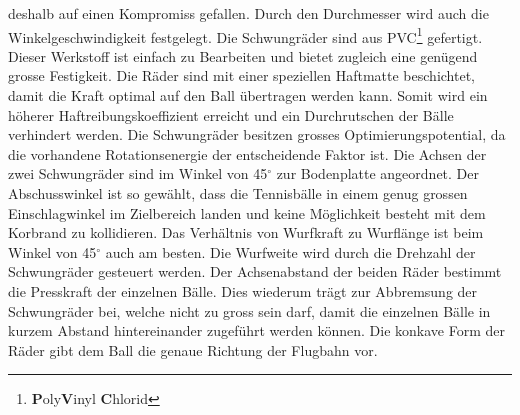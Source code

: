 deshalb auf einen Kompromiss gefallen. Durch den Durchmesser wird auch die Winkelgeschwindigkeit
festgelegt. Die Schwungräder sind aus PVC\footnote{\textbf{P}oly\textbf{V}inyl \textbf{C}hlorid}
gefertigt. Dieser Werkstoff ist einfach zu Bearbeiten und bietet zugleich eine genügend grosse
Festigkeit. Die Räder sind mit einer speziellen Haftmatte beschichtet, damit die Kraft optimal auf
den Ball übertragen werden kann. Somit wird ein höherer Haftreibungskoeffizient erreicht und ein
Durchrutschen der Bälle verhindert werden. Die Schwungräder besitzen grosses Optimierungspotential,
da die vorhandene Rotationsenergie der entscheidende Faktor ist. Die Achsen der zwei Schwungräder
sind im Winkel von 45$^\circ$ zur Bodenplatte angeordnet. Der Abschusswinkel ist so gewählt, dass die
Tennisbälle in einem genug grossen Einschlagwinkel im Zielbereich landen und keine Möglichkeit
besteht mit dem Korbrand zu kollidieren. Das Verhältnis von Wurfkraft zu Wurflänge ist beim Winkel
von 45$^\circ$ auch am besten. Die Wurfweite wird durch die Drehzahl der Schwungräder gesteuert werden. Der
Achsenabstand der beiden Räder bestimmt die Presskraft der einzelnen Bälle. Dies wiederum trägt zur
Abbremsung der Schwungräder bei, welche nicht zu gross sein darf, damit die einzelnen Bälle in
kurzem Abstand hintereinander zugeführt werden können. Die konkave Form der Räder gibt dem Ball die
genaue Richtung der Flugbahn vor.
	
	
	